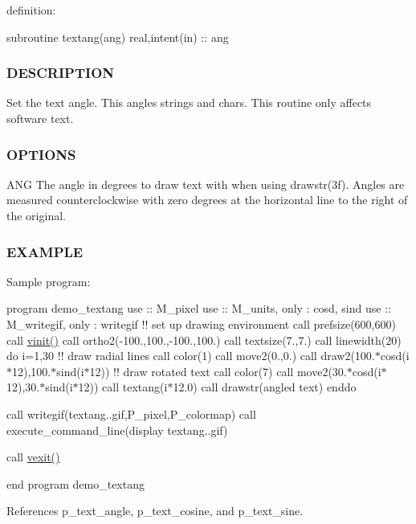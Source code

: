 definition\+:

subroutine textang(ang) real,intent(in) \+:\+: ang

\subsubsection*{D\+E\+S\+C\+R\+I\+P\+T\+I\+ON}

Set the text angle. This angles strings and chars. This routine only affects software text.

\subsubsection*{O\+P\+T\+I\+O\+NS}

A\+NG The angle in degrees to draw text with when using drawstr(3f). Angles are measured counterclockwise with zero degrees at the horizontal line to the right of the original.

\subsubsection*{E\+X\+A\+M\+P\+LE}

Sample program\+:

program demo\+\_\+textang use \+:\+: M\+\_\+pixel use \+:\+: M\+\_\+units, only \+: cosd, sind use \+:\+: M\+\_\+writegif, only \+: writegif !! set up drawing environment call prefsize(600,600) call \hyperlink{namespacem__pixel_ac03ca8f23fdadb60599b6ea4dc87a6d9}{vinit()} call ortho2(-\/100.,100.,-\/100.,100.) call textsize(7.,7.) call linewidth(20) do i=1,30 !! draw radial lines call color(1) call move2(0.,0.) call draw2(100.$\ast$cosd(i$\ast$12),100.$\ast$sind(i$\ast$12)) !! draw rotated text call color(7) call move2(30.$\ast$cosd(i$\ast$12),30.$\ast$sind(i$\ast$12)) call textang(i$\ast$12.0) call drawstr(\textquotesingle{}angled text\textquotesingle{}) enddo

call writegif(\textquotesingle{}textang..\+gif\textquotesingle{},P\+\_\+pixel,P\+\_\+colormap) call execute\+\_\+command\+\_\+line(\textquotesingle{}display textang..\+gif\textquotesingle{})

call \hyperlink{namespacem__pixel_a19ad6b65752322b0029a62cc0ebec3e8}{vexit()}

end program demo\+\_\+textang 

References p\+\_\+text\+\_\+angle, p\+\_\+text\+\_\+cosine, and p\+\_\+text\+\_\+sine.

\mbox{\label{namespacem__pixel_a070e9fff1f2cd0c89d40c5d3c72b7f2c}} 
